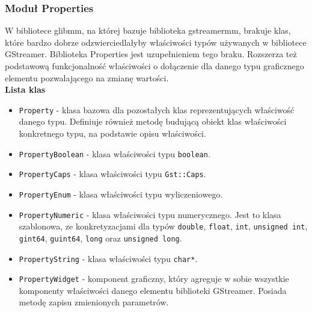 \documentclass[12pt]{article}
\begin{document}
\subsubsection{Moduł Properties}
W bibliotece glibmm, na której bazuje biblioteka gstreamermm, brakuje klas, które bardzo dobrze odzwierciedlałyby właściwości typów używanych w bibliotece GStreamer. Biblioteka Properties jest uzupełnieniem tego braku. Rozszerza też podstawową funkcjonalność właściwości o dołączenie dla  danego typu graficznego elementu pozwalającego na zmianę wartości. \\
\textbf{Lista klas}
\begin{itemize}
  \setlength{\itemsep}{0em}
\item \texttt{Property} - klasa bazowa dla pozostałych klas reprezentujących właściwość danego typu. Definiuje również metodę budującą obiekt  klas właściwości konkretnego typu, na podstawie opisu właściwości.
\item \texttt{PropertyBoolean} - klasa właściwości typu \texttt{boolean}.
\item \texttt{PropertyCaps} - klasa właściwości typu \texttt{Gst::Caps}.
\item \texttt{PropertyEnum} - klasa właściwości typu wyliczeniowego.
\item \texttt{PropertyNumeric} - klasa właściwości typu numerycznego. Jest to klasa szablonowa, ze konkretyzacjami dla typów \texttt{double}, \texttt{float}, \texttt{int}, \texttt{unsigned int}, \texttt{gint64}, \texttt{guint64}, \texttt{long} oraz \texttt{unsigned long}.
\item \texttt{PropertyString} - klasa właściwości typu \texttt{char*}.
\item \texttt{PropertyWidget} - komponent graficzny, który agreguje w sobie wszystkie komponenty właściwości danego elementu biblioteki GStreamer. Posiada metodę zapisu zmienionych parametrów.
\end{itemize}
\end{document}
